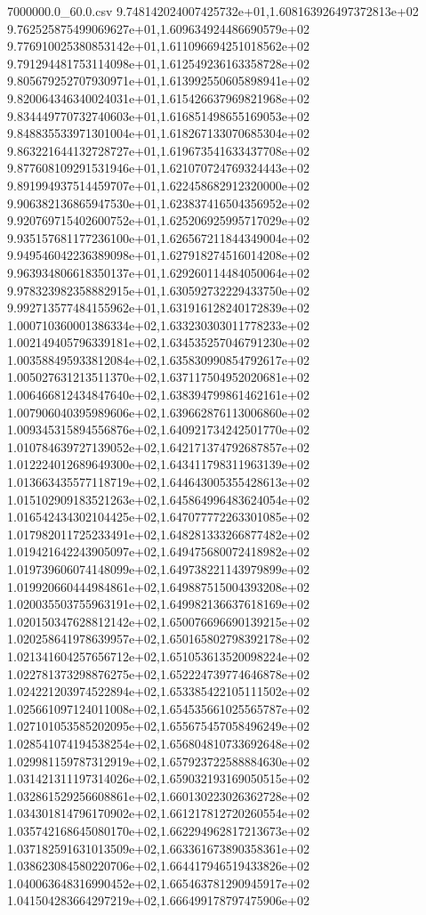 \begin{filecontents*}{7000000.0_60.0.csv}
9.748142024007425732e+01,1.608163926497372813e+02
9.762525875499069627e+01,1.609634924486690579e+02
9.776910025380853142e+01,1.611096694251018562e+02
9.791294481753114098e+01,1.612549236163358728e+02
9.805679252707930971e+01,1.613992550605898941e+02
9.820064346340024031e+01,1.615426637969821968e+02
9.834449770732740603e+01,1.616851498655169053e+02
9.848835533971301004e+01,1.618267133070685304e+02
9.863221644132728727e+01,1.619673541633437708e+02
9.877608109291531946e+01,1.621070724769324443e+02
9.891994937514459707e+01,1.622458682912320000e+02
9.906382136865947530e+01,1.623837416504356952e+02
9.920769715402600752e+01,1.625206925995717029e+02
9.935157681177236100e+01,1.626567211844349004e+02
9.949546042236389098e+01,1.627918274516014208e+02
9.963934806618350137e+01,1.629260114484050064e+02
9.978323982358882915e+01,1.630592732229433750e+02
9.992713577484155962e+01,1.631916128240172839e+02
1.000710360001386334e+02,1.633230303011778233e+02
1.002149405796339181e+02,1.634535257046791230e+02
1.003588495933812084e+02,1.635830990854792617e+02
1.005027631213511370e+02,1.637117504952020681e+02
1.006466812434847640e+02,1.638394799861462161e+02
1.007906040395989606e+02,1.639662876113006860e+02
1.009345315894556876e+02,1.640921734242501770e+02
1.010784639727139052e+02,1.642171374792687857e+02
1.012224012689649300e+02,1.643411798311963139e+02
1.013663435577118719e+02,1.644643005355428613e+02
1.015102909183521263e+02,1.645864996483624054e+02
1.016542434302104425e+02,1.647077772263301085e+02
1.017982011725233491e+02,1.648281333266877482e+02
1.019421642243905097e+02,1.649475680072418982e+02
1.019739606074148099e+02,1.649738221143979899e+02
1.019920660444984861e+02,1.649887515004393208e+02
1.020035503755963191e+02,1.649982136637618169e+02
1.020150347628812142e+02,1.650076696690139215e+02
1.020258641978639957e+02,1.650165802798392178e+02
1.021341604257656712e+02,1.651053613520098224e+02
1.022781373298876275e+02,1.652224739774646878e+02
1.024221203974522894e+02,1.653385422105111502e+02
1.025661097124011008e+02,1.654535661025565787e+02
1.027101053585202095e+02,1.655675457058496249e+02
1.028541074194538254e+02,1.656804810733692648e+02
1.029981159787312919e+02,1.657923722588884630e+02
1.031421311197314026e+02,1.659032193169050515e+02
1.032861529256608861e+02,1.660130223026362728e+02
1.034301814796170902e+02,1.661217812720260554e+02
1.035742168645080170e+02,1.662294962817213673e+02
1.037182591631013509e+02,1.663361673890358361e+02
1.038623084580220706e+02,1.664417946519433826e+02
1.040063648316990452e+02,1.665463781290945917e+02
1.041504283664297219e+02,1.666499178797475906e+02

\end{filecontents*}
